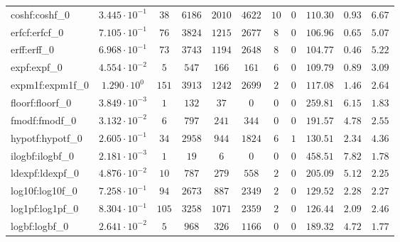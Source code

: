 \begin{tabular}{|l|c|c|c|c|c|c|c|c|c|c|}
coshf:coshf\_0               & $ 3.445 \cdot 10^{-1} $ & $ 38     $ & $ 6186   $ & $ 2010  $ & $ 4622  $ & $ 10  $ & $ 0 $ & $ 110.30      $ & $ 0.93    $ & $ 6.67    $ \\
erfcf:erfcf\_0               & $ 7.105 \cdot 10^{-1} $ & $ 76     $ & $ 3824   $ & $ 1215  $ & $ 2677  $ & $ 8   $ & $ 0 $ & $ 106.96      $ & $ 0.65    $ & $ 5.07    $ \\
erff:erff\_0                 & $ 6.968 \cdot 10^{-1} $ & $ 73     $ & $ 3743   $ & $ 1194  $ & $ 2648  $ & $ 8   $ & $ 0 $ & $ 104.77      $ & $ 0.46    $ & $ 5.22    $ \\
expf:expf\_0                 & $ 4.554 \cdot 10^{-2} $ & $ 5      $ & $ 547    $ & $ 166   $ & $ 161   $ & $ 6   $ & $ 0 $ & $ 109.79      $ & $ 0.89    $ & $ 3.09    $ \\
expm1f:expm1f\_0             & $ 1.290 \cdot 10^{0}  $ & $ 151    $ & $ 3913   $ & $ 1242  $ & $ 2699  $ & $ 2   $ & $ 0 $ & $ 117.08      $ & $ 1.46    $ & $ 2.64    $ \\
floorf:floorf\_0             & $ 3.849 \cdot 10^{-3} $ & $ 1      $ & $ 132    $ & $ 37    $ & $ 0     $ & $ 0   $ & $ 0 $ & $ 259.81      $ & $ 6.15    $ & $ 1.83    $ \\
fmodf:fmodf\_0               & $ 3.132 \cdot 10^{-2} $ & $ 6      $ & $ 797    $ & $ 241   $ & $ 344   $ & $ 0   $ & $ 0 $ & $ 191.57      $ & $ 4.78    $ & $ 2.55    $ \\
hypotf:hypotf\_0             & $ 2.605 \cdot 10^{-1} $ & $ 34     $ & $ 2958   $ & $ 944   $ & $ 1824  $ & $ 6   $ & $ 1 $ & $ 130.51      $ & $ 2.34    $ & $ 4.36    $ \\
ilogbf:ilogbf\_0             & $ 2.181 \cdot 10^{-3} $ & $ 1      $ & $ 19     $ & $ 6     $ & $ 0     $ & $ 0   $ & $ 0 $ & $ 458.51      $ & $ 7.82    $ & $ 1.78    $ \\
ldexpf:ldexpf\_0             & $ 4.876 \cdot 10^{-2} $ & $ 10     $ & $ 787    $ & $ 279   $ & $ 558   $ & $ 2   $ & $ 0 $ & $ 205.09      $ & $ 5.12    $ & $ 2.25    $ \\
log10f:log10f\_0             & $ 7.258 \cdot 10^{-1} $ & $ 94     $ & $ 2673   $ & $ 887   $ & $ 2349  $ & $ 2   $ & $ 0 $ & $ 129.52      $ & $ 2.28    $ & $ 2.27    $ \\
log1pf:log1pf\_0             & $ 8.304 \cdot 10^{-1} $ & $ 105    $ & $ 3258   $ & $ 1071  $ & $ 2359  $ & $ 2   $ & $ 0 $ & $ 126.44      $ & $ 2.09    $ & $ 2.46    $ \\
logbf:logbf\_0               & $ 2.641 \cdot 10^{-2} $ & $ 5      $ & $ 968    $ & $ 326   $ & $ 1166  $ & $ 0   $ & $ 0 $ & $ 189.32      $ & $ 4.72    $ & $ 1.77    $ \\

\end{tabular}
